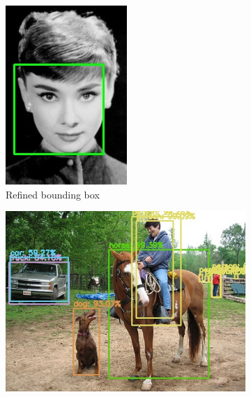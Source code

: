 \begin{figure}[!h]
\begin{subfigure}{.13\linewidth}
		\includegraphics[width=0.9\linewidth]{images/detection/img1_withNMS}
		\caption{Refined bounding box}
		\label{fig:sub_withNMS}
	\end{subfigure}
	\begin{subfigure}{.35\linewidth}
		\includegraphics[width=0.9\linewidth]{images/detection/ex2_yolo_noNMS}

\end{subfigure}
\end{figure}
